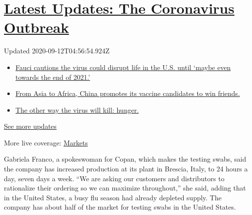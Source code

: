 \hypertarget{latest-updates-the-coronavirus-outbreak}{%
\section{\texorpdfstring{\href{https://www.nytimes3xbfgragh.onion/2020/09/11/world/covid-19-coronavirus.html?action=click\&pgtype=Article\&state=default\&region=MAIN_CONTENT_1\&context=storylines_live_updates}{Latest
Updates: The Coronavirus
Outbreak}}{Latest Updates: The Coronavirus Outbreak}}\label{latest-updates-the-coronavirus-outbreak}}

Updated 2020-09-12T04:56:54.924Z

\begin{itemize}
\tightlist
\item
  \href{https://www.nytimes3xbfgragh.onion/2020/09/11/world/covid-19-coronavirus.html?action=click\&pgtype=Article\&state=default\&region=MAIN_CONTENT_1\&context=storylines_live_updates\#link-dfb8a16}{Fauci
  cautions the virus could disrupt life in the U.S. until `maybe even
  towards the end of 2021.'}
\item
  \href{https://www.nytimes3xbfgragh.onion/2020/09/11/world/covid-19-coronavirus.html?action=click\&pgtype=Article\&state=default\&region=MAIN_CONTENT_1\&context=storylines_live_updates\#link-7104d154}{From
  Asia to Africa, China promotes its vaccine candidates to win friends.}
\item
  \href{https://www.nytimes3xbfgragh.onion/2020/09/11/world/covid-19-coronavirus.html?action=click\&pgtype=Article\&state=default\&region=MAIN_CONTENT_1\&context=storylines_live_updates\#link-393ad215}{The
  other way the virus will kill: hunger.}
\end{itemize}

\href{https://www.nytimes3xbfgragh.onion/2020/09/11/world/covid-19-coronavirus.html?action=click\&pgtype=Article\&state=default\&region=MAIN_CONTENT_1\&context=storylines_live_updates}{See
more updates}

More live coverage:
\href{https://www.nytimes3xbfgragh.onion/live/2020/09/11/business/stock-market-today-coronavirus?action=click\&pgtype=Article\&state=default\&region=MAIN_CONTENT_1\&context=storylines_live_updates}{Markets}

Gabriela Franco, a spokeswoman for Copan, which makes the testing swabs,
said the company has increased production at its plant in Brescia,
Italy, to 24 hours a day, seven days a week. ``We are asking our
customers and distributors to rationalize their ordering so we can
maximize throughout,'' she said, adding that in the United States, a
busy flu season had already depleted supply. The company has about half
of the market for testing swabs in the United States.

